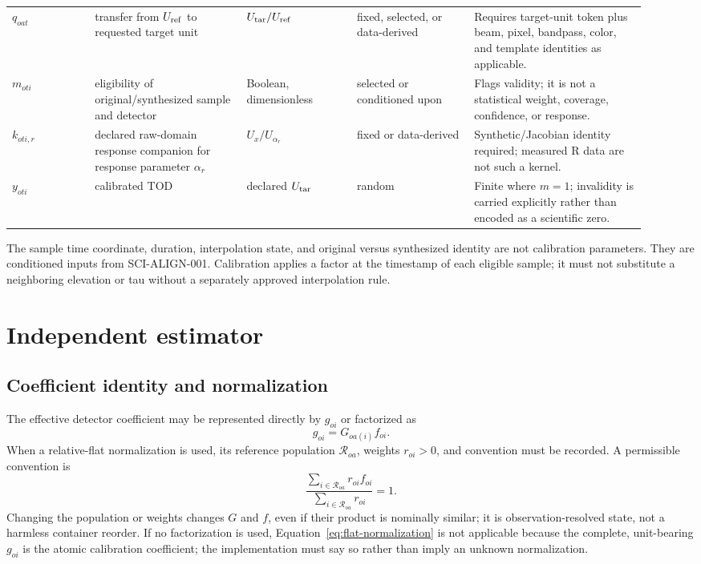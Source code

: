 \documentclass[11pt]{article}
\begin{document}
\begin{longtable}{L{0.12\linewidth}L{0.22\linewidth}L{0.16\linewidth}L{0.17\linewidth}L{0.25\linewidth}}
\(q_{oat}\) & transfer from \(U_{\rm ref}\) to requested target unit & \(U_{\rm tar}/U_{\rm ref}\) & fixed, selected, or data-derived & Requires target-unit token plus beam, pixel, bandpass, color, and template identities as applicable.\\
\(m_{oti}\) & eligibility of original/synthesized sample and detector & Boolean, dimensionless & selected or conditioned upon & Flags validity; it is not a statistical weight, coverage, confidence, or response.\\
\(k_{oti,r}\) & declared raw-domain response companion for response parameter \(\alpha_r\) & \(U_x/U_{\alpha_r}\) & fixed or data-derived & Synthetic/Jacobian identity required; measured R data are not such a kernel.\\
\(y_{oti}\) & calibrated TOD & declared \(U_{\rm tar}\) & random & Finite where \(m=1\); invalidity is carried explicitly rather than encoded as a scientific zero.\\
\bottomrule
\end{longtable}

The sample time coordinate, duration, interpolation state, and original versus
synthesized identity are not calibration parameters.  They are conditioned
inputs from SCI-ALIGN-001.  Calibration applies a factor at the timestamp of
each eligible sample; it must not substitute a neighboring elevation or tau
without a separately approved interpolation rule.

\section{Independent estimator}

\subsection{Coefficient identity and normalization}

The effective detector coefficient may be represented directly by \(g_{oi}\)
or factorized as
\begin{equation}
  g_{oi}=G_{oa(i)} f_{oi}.
  \label{eq:gain-factorization}
\end{equation}
When a relative-flat normalization is used, its reference population
\(\mathcal R_{oa}\), weights \(r_{oi}>0\), and convention must be recorded.  A
permissible convention is
\begin{equation}
  \frac{\sum_{i\in\mathcal R_{oa}} r_{oi} f_{oi}}
       {\sum_{i\in\mathcal R_{oa}} r_{oi}}=1.
  \label{eq:flat-normalization}
\end{equation}
Changing the population or weights changes \(G\) and \(f\), even if their
product is nominally similar; it is observation-resolved state, not a harmless
container reorder.  If no factorization is used, Equation~\eqref{eq:flat-normalization}
is not applicable because the complete, unit-bearing \(g_{oi}\) is the atomic
calibration coefficient; the implementation must say so rather than imply an
unknown normalization.
\end{document}

